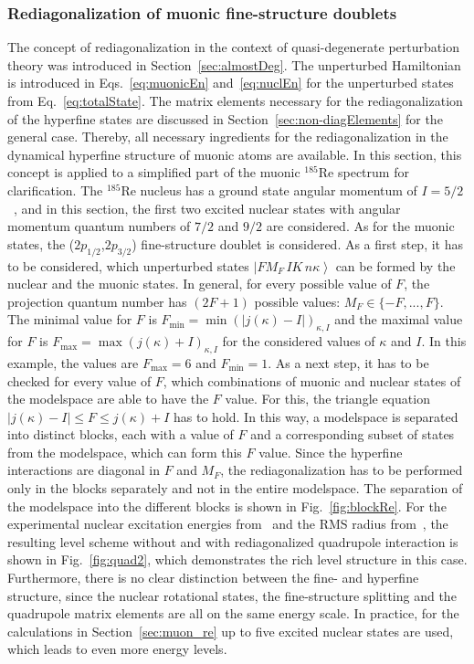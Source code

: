 \subsubsection{Rediagonalization of muonic fine-structure doublets}
\label{sec:toyModelRediag}
The concept of rediagonalization in the context of quasi-degenerate perturbation theory was introduced in Section~\ref{sec:almostDeg}. The unperturbed Hamiltonian is introduced in Eqs.~\eqref{eq:muonicEn} and~\eqref{eq:nuclEn} for the unperturbed states from Eq.~\eqref{eq:totalState}. The matrix elements necessary for the rediagonalization of the hyperfine states are discussed in Section~\ref{sec:non-diagElements} for the general case. Thereby, all necessary ingredients for the rediagonalization in the dynamical hyperfine structure of muonic atoms are available. In this section, this concept is applied to a simplified part of the muonic $^{185}$Re spectrum for clarification. The $^{185}$Re nucleus has a ground state angular momentum of $I=5/2$~\cite{Stone2005}, and in this section, the first two excited nuclear states with angular momentum quantum numbers of $7/2$ and $9/2$ are considered. As for the muonic states, the ($2p_{1/2}$,$2p_{3/2}$) fine-structure doublet is considered. 
As a first step, it has to be considered, which unperturbed states $\left|FM_F\,IK\,n\kappa\right>$ can be formed by the nuclear and the muonic states. In general, for every possible value of $F$, the projection quantum number has $(2F+1)$ possible values: $M_F\in \{-F,...,F\}$. The minimal value for $F$ is $F_{\text{min}}=\min(|j(\kappa)-I|)_{\kappa, I}$ and the maximal value for $F$ is $F_{\text{max}}=\max(j(\kappa)+I)_{\kappa, I}$ for the considered values of $\kappa$ and $I$. In this example, the values are $F_{\text{max}}=6$ and $F_{\text{min}}=1$. As a next step, it has to be checked for every value of $F$, which combinations of muonic and nuclear states of the modelspace are able to have the $F$ value. For this, the triangle equation $|j(\kappa)-I|\leq F \leq j(\kappa)+I$ has to hold. In this way, a modelspace is separated into distinct blocks, each with a value of $F$ and a corresponding subset of states from the modelspace, which can form this $F$ value. Since the hyperfine interactions are diagonal in $F$ and $M_F$, the rediagonalization has to be performed only in the blocks separately and not in the entire modelspace. The separation of the modelspace into the different blocks is shown in Fig.~\ref{fig:blockRe}. For the experimental nuclear excitation energies from~\cite{ENSDF} and the RMS radius from~\cite{Angeli2013}, the resulting level scheme without and with rediagonalized quadrupole interaction is shown in Fig.~\ref{fig:quad2}, which demonstrates the rich level structure in this case. Furthermore, there is no clear distinction between the fine- and hyperfine structure, since the nuclear rotational states, the fine-structure splitting and the quadrupole matrix elements are all on the same energy scale. In practice, for the calculations in Section~\ref{sec:muon_re} up to five excited nuclear states are used, which leads to even more energy levels.

